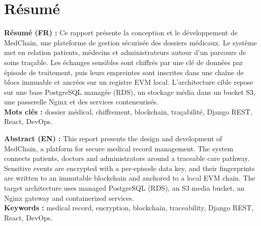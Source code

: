 \documentclass[11pt,openany]{memoir}
\begin{document}
\setcounter{secnumdepth}{3}

\thispagestyle{empty}


\chapter*{Résumé}
\textbf{Résumé (FR) :} Ce rapport présente la conception et le développement de MedChain, une plateforme de gestion sécurisée des dossiers médicaux. Le système met en relation patients, médecins et administrateurs autour d'un parcours de soins traçable. Les échanges sensibles sont chiffrés par une clé de données par épisode de traitement, puis leurs empreintes sont inscrites dans une chaîne de blocs immuable et ancrées sur un registre EVM local. L'architecture cible repose sur une base PostgreSQL managée (RDS), un stockage média dans un bucket S3, une passerelle Nginx et des services conteneurisés. \\
\textbf{Mots clés :} dossier médical, chiffrement, blockchain, traçabilité, Django REST, React, DevOps.
\bigskip

\textbf{Abstract (EN) :} This report presents the design and development of MedChain, a platform for secure medical record management. The system connects patients, doctors and administrators around a traceable care pathway. Sensitive events are encrypted with a per-episode data key, and their fingerprints are written to an immutable blockchain and anchored to a local EVM chain. The target architecture uses managed PostgreSQL (RDS), an S3 media bucket, an Nginx gateway and containerized services. \\
\textbf{Keywords :} medical record, encryption, blockchain, traceability, Django REST, React, DevOps.

\restoregeometry
\tableofcontents

\listoftables
{}

\listoffigures
{}








\printglossaries
\end{document}
